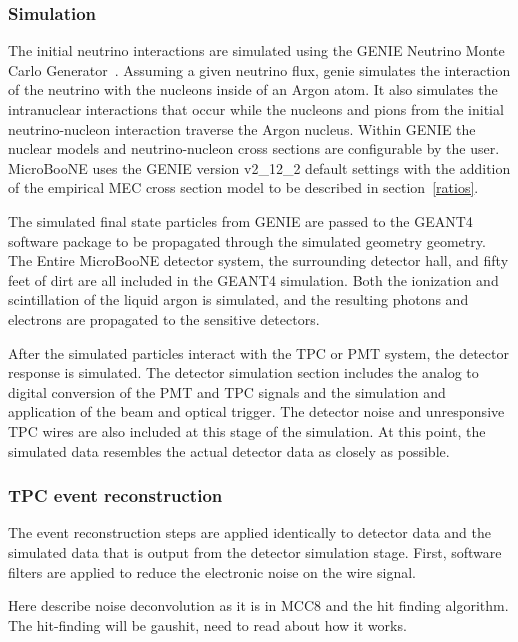   \subsubsection{Simulation}
    The initial neutrino interactions are simulated using the GENIE Neutrino
    Monte Carlo Generator~\cite{Andreopoulos:2009rq,Andreopoulos:2015wxa}.
    Assuming a given neutrino flux, genie simulates the interaction of the
    neutrino with the nucleons inside of an Argon atom. It also simulates the
    intranuclear interactions that occur while the nucleons and pions from the
    initial neutrino-nucleon interaction traverse the Argon nucleus.  Within
    GENIE the nuclear models and neutrino-nucleon cross sections are
    configurable by the user.  MicroBooNE uses the GENIE version v2\_12\_2
    default settings with the addition of the empirical MEC cross section model
    to be described in section~\ref{ratios}.

    The simulated final state particles from GENIE are passed to the
    GEANT4~\cite{geant4} software package to be propagated through the
    simulated geometry geometry. The Entire MicroBooNE detector system, the
    surrounding detector hall, and fifty feet of dirt are all included in the
    GEANT4 simulation. Both the ionization and scintillation of the liquid
    argon is simulated, and the resulting photons and electrons are propagated
    to the sensitive detectors.

    After the simulated particles interact with the TPC or PMT system, the
    detector response is simulated. The detector simulation section includes
    the analog to digital conversion of the PMT and TPC signals and the
    simulation and application of the beam and optical trigger. The detector
    noise and unresponsive TPC wires are also included at this stage of the
    simulation. At this point, the simulated data resembles the actual detector
    data as closely as possible.

  \subsubsection{TPC event reconstruction}
    The event reconstruction steps are applied identically to detector data and
    the simulated data that is output from the detector simulation stage.
    First, software filters are applied to reduce the electronic noise on the
    wire signal.

    Here describe noise deconvolution as it is in MCC8 and the hit finding
    algorithm. The hit-finding will be gaushit, need to read about how it
    works.

